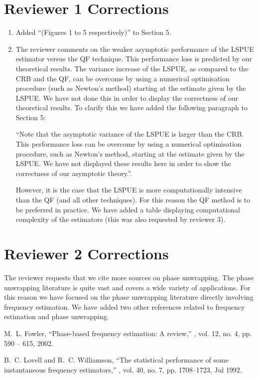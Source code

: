 \documentclass{article}
\begin{document}
\section{Reviewer 1 Corrections}

\begin{enumerate}
\item Added ``(Figures 1 to 5 respectively)'' to Section 5.
\item The reviewer comments on the weaker asymptotic performance of the LSPUE estimator versus the QF technique.  This performance loss is predicted by our theoretical results.  The variance increase of the LSPUE, as compared to the CRB and the QF, can be overcome by using a numerical optimisation procedure (such as Newton's method) starting at the estimate given by the LSPUE.  We have not done this in order to display the correctness of our theoretical results.  To clarify this we have added the following paragraph to Section 5:

``Note that the asymptotic variance of the LSPUE is larger than the CRB.  This performance loss can be overcome by using a numerical optimisation procedure, such as Newton's method, starting at the estimate given by the LSPUE.  We have not displayed these results here in order to show the correctness of our asymptotic theory.''.

However, it is the case that the LSPUE is more computationally intensive than the QF (and all other techniques).  For this reason the QF method is to be preferred in practice. We have added a table displaying computational complexity of the estimators (this was also requested by reviewer 3).
\end{enumerate}

\section{Reviewer 2 Corrections}

The reviewer requests that we cite more sources on phase unwrapping.  The phase unwrapping literature is quite vast and covers a wide variety of applications.  For this reason we have focused on the phase unwrapping literature directly involving frequency estimation. We have added two other references related to frequency estimation and phase unwrapping.


\begin{thebibliography}{10}

M.~L. Fowler,
\newblock ``Phase-based frequency estimation: A review,''
, vol. 12, no. 4, pp. 590 -- 615,
  2002.
  
B.~C. Lovell and R.~C. Williamson,
\newblock ``The statistical performance of some instantaneous frequency
  estimators,''
, vol. 40, no. 7, pp. 1708--1723,
  Jul 1992.

\end{thebibliography}
\end{document}
